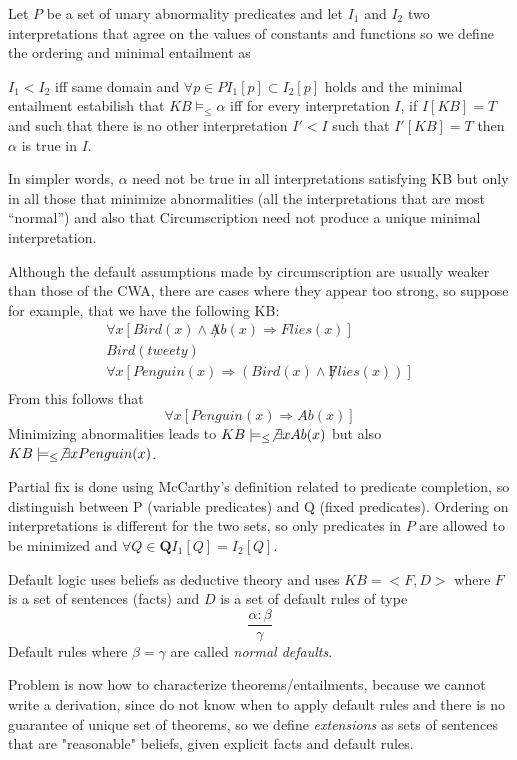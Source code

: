 Let $P$ be a set of unary abnormality predicates and let $I_1$ and $I_2$ two 
interpretations that agree on the values of constants and functions so we define 
the ordering and minimal entailment as 
\begin{defi}
  $I_1 < I_2$ iff same domain and $\forall p \in P I_1[p] \subset I_2[p]$ holds and the 
  minimal entailment estabilish that $KB \models _{\leq} \alpha$ iff for every 
  interpretation $I$, if $I[KB] = T$ and such that there is no other interpretation $I'<I$
  such that $I'[KB] = T$ then $\alpha$ is true in $I$.
\end{defi}
In simpler words, $\alpha$ need not be true in all interpretations satisfying KB
but only in all those that minimize abnormalities (all the interpretations that
are most “normal”) and also that Circumscription need not produce
a unique minimal interpretation.

Although the default assumptions made by circumscription are usually weaker than
those of the CWA, there are cases where they appear too strong, so suppose for example,
that we have the following KB:
\begin{align*}
  \forall x [Bird(x) \wedge \not Ab(x) \Rightarrow Flies(x)] \\
  Bird(tweety) \\
  \forall x [Penguin(x) \Rightarrow (Bird(x) \wedge \not Flies(x))] \\
\end{align*}
From this follows that 
\[ \forall x [Penguin(x) \Rightarrow Ab(x)] \]
Minimizing abnormalities leads to $KB \models_{\leq} \not \exists x Ab(x)$ but also
$KB \models_{\leq} \not \exists x Penguin(x)$.

Partial fix is done using McCarthy's definition related to predicate completion, so
distinguish between P (variable predicates) and Q (fixed predicates).\newline
Ordering on interpretations is different for the two sets, so only predicates in $P$
are allowed to be minimized and $\forall Q \in \mathbf{Q} I_1[Q] = I_2[Q]$.

Default logic uses beliefs as deductive theory and uses $KB = <F, D>$ where 
$F$ is a set of sentences (facts) and $D$ is a set of default rules of type 
\[ \frac{\alpha : \beta}{\gamma} \]
Default rules where $\beta = \gamma$ are called \emph{normal defaults}.

Problem is now how to characterize theorems/entailments, because we cannot write a 
derivation, since do not know when to apply default rules and there is 
no guarantee of unique set of theorems, so we define \emph{extensions} as
sets of sentences that are "reasonable" beliefs, given explicit facts and 
default rules.

